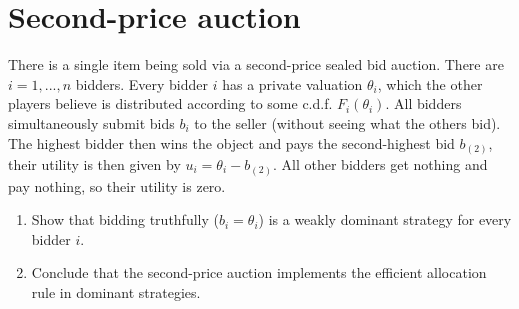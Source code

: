 \documentclass[a4paper]{article}
\newif\ifsolutions
\begin{document}
%
%
%	
%



\section{Second-price auction}

There is a single item being sold via a second-price sealed bid auction. There are $i={1,...,n}$ bidders. Every bidder $i$ has a private valuation $\theta_i$, which the other players believe is distributed according to some c.d.f. $F_i(\theta_i)$. All bidders simultaneously submit bids $b_i$ to the seller (without seeing what the others bid). The highest bidder then wins the object and pays the second-highest bid $b_{(2)}$, their utility is then given by $u_i = \theta_i - b_{(2)}$. All other bidders get nothing and pay nothing, so their utility is zero.
\begin{enumerate}
	\item Show that bidding truthfully ($b_i=\theta_i$) is a weakly dominant strategy for every bidder $i$.
	\item Conclude that the second-price auction implements the efficient allocation rule in dominant strategies.
\end{enumerate}

\ifsolutions
\end{document}
